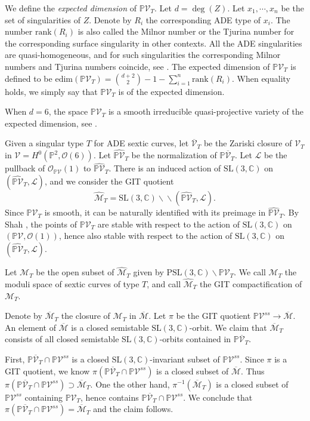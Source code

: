 \documentclass[12pt,reqno,a4paper]{amsart}
\theoremstyle{remark}
\theoremstyle{definition}
\newcommand{\CC}{\mathbb{C}}
\newcommand{\PP}{\mathbb{P}}
\newcommand{\calM}{\mathcal{M}}
\newcommand{\calV}{\mathcal{V}}
\newcommand{\calO}{\mathcal{O}}
\newcommand{\calL}{\mathcal{L}}
\newcommand\SL{\mathrm{SL}}
\newcommand\PSL{\mathrm{PSL}}
\newcommand{\edim}{\mathrm{edim}}
\newcommand{\rank}{\mathrm{rank}}
\newcommand{\bs}{\backslash}
\newcommand{\dbs}{\bs\!\! \bs}
\begin{document}
We define the \emph{expected dimension} of $\PP\calV_T$. Let $d=\deg(Z)$. 
Let $x_1,\cdots,x_n$ be the set of singularities of $Z$.
Denote by $R_i$ the corresponding ADE type of $x_i$. The number $\rank(R_i)$ is also called the Milnor number or the Tjurina number for the corresponding surface singularity in other contexts. 
All the ADE singularities are quasi-homogeneous, and for such singularities the corresponding Milnor numbers and Tjurina numbers coincide, see \cite{saito1971quasihomogene}.
The expected dimension of $\PP\calV_T$ is defined to be $\edim(\PP\calV_T)=\binom{d+2}{2}-1-\sum\limits_{i=1}^n \rank(R_i)$. 
When equality holds, we simply say that $\PP\calV_T$ is of the expected dimension.


When $d=6$, the space $\PP\calV_T$ is a smooth irreducible quasi-projective variety of the expected dimension, see \cite[Corollary 5.1(b)]{greuel1996equianalytic}. 

Given a singular type $T$ for ADE sextic curves, let $\overline{\calV}_T$ be the Zariski closure of $\calV_T$ in $\calV=H^0(\PP^2, \calO(6))$. Let $\widehat{\PP\calV}_T$ be the normalization of $\PP\overline{\calV}_T$. Let $\calL$ be the pullback of $\calO_{\PP\calV}(1)$ to $\widehat{\PP\calV}_T$. There is an induced action of $\SL(3, \CC)$ on $(\widehat{\PP\calV}_T, \calL)$, and we consider the GIT quotient
\[
\widehat{\calM}_T=\SL(3, \CC) \dbs (\widehat{\PP\calV}_T, \calL).
\]
Since $\PP\calV_T$ is smooth, it can be naturally identified with its preimage in $\widehat{\PP\calV}_T$. By Shah \cite{shah1980complete}, the points of $\PP\calV_T$ are stable with respect to the action of $\SL(3, \CC)$ on $(\PP\calV, \calO(1))$, hence also stable with respect to the action of $\SL(3, \CC)$ on $(\widehat{\PP\calV}_T, \calL)$.

Let $\calM_T$ be the open subset of $\widehat{\calM}_T$ given by $\PSL(3, \CC)\bs \PP\calV_T$. We call $\calM_T$ the moduli space of sextic curves of type $T$, and call $\widehat{\calM}_T$ the GIT compactification of $\calM_T$. 

Denote by $\overline{\calM}_T$ the closure of $\calM_T$ in $\overline{\calM}$. Let $\pi$ be the GIT quotient $\PP\calV^{ss} \to \overline{\calM}$. An element of $\overline{\calM}$ is a closed semistable $\SL(3, \CC)$-orbit. We claim that $\overline{\calM}_T$ consists of all closed semistable $\SL(3,\CC)$-orbits contained in $\PP\overline{\calV}_T$. 

First, $\PP\overline{\calV}_T \cap \PP\calV^{ss}$ is a closed $\SL(3,\CC)$-invariant subset of $\PP\calV^{ss}$. Since $\pi$ is a GIT quotient, we know $\pi(\PP\overline{\calV}_T \cap \PP\calV^{ss})$ is a closed subset of $\overline{\calM}$. Thus $\pi(\PP\overline{\calV}_T \cap \PP\calV^{ss})\supset\overline{\calM}_T$. One the other hand, $\pi^{-1}(\overline{\calM}_T)$ is a closed subset of $\PP\calV^{ss}$ containing $\PP\calV_T$, hence contains $\PP\overline{\calV}_T \cap \PP\calV^{ss}$. We conclude that $\pi(\PP\overline{\calV}_T \cap \PP\calV^{ss})=\overline{\calM}_T$ and the claim follows.
\end{document}
